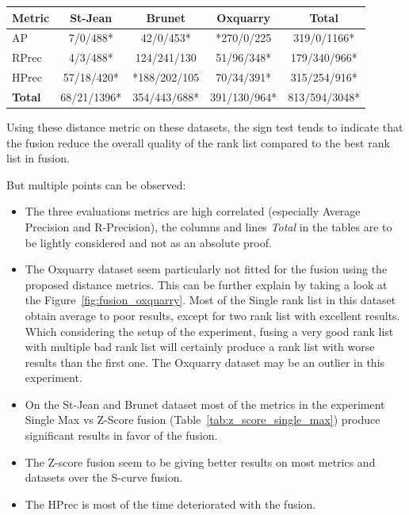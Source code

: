 \begin{table}
  \label{tab:s_curve_z_score}
  \begin{tabular}{l c c c c}
    \toprule
    Metric        & St-Jean     & Brunet       & Oxquarry     & \textbf{Total} \\ \midrule
    AP            & 7/0/488*    & 42/0/453*    & *270/0/225   & 319/0/1166*    \\
    RPrec         & 4/3/488*    & 124/241/130  & 51/96/348*   & 179/340/966*   \\
    HPrec         & 57/18/420*  & *188/202/105 & 70/34/391*   & 315/254/916*   \\
    \textbf{Total}& 68/21/1396* & 354/443/688* & 391/130/964* & 813/594/3048*  \\
    \bottomrule
  \end{tabular}
\end{table}

Using these distance metric on these datasets, the sign test tends to indicate that the fusion reduce the overall quality of the rank list compared to the best rank list in fusion.

But multiple points can be observed:
\begin{itemize}
  \item
  The three evaluations metrics are high correlated (especially Average Precision and R-Precision), the columns and lines \textit{Total} in the tables are to be lightly considered and not as an absolute proof.
  \item
  The Oxquarry dataset seem particularly not fitted for the fusion using the proposed distance metrics.
  This can be further explain by taking a look at the Figure~\ref{fig:fusion_oxquarry}.
  Most of the Single rank list in this dataset obtain average to poor results, except for two rank list with excellent results.
  Which considering the setup of the experiment, fusing a very good rank list with multiple bad rank list will certainly produce a rank list with worse results than the first one.
  The Oxquarry dataset may be an outlier in this experiment.
  \item
  On the St-Jean and Brunet dataset most of the metrics in the experiment Single Max vs Z-Score fusion (Table~\ref{tab:z_score_single_max}) produce significant results in favor of the fusion.
  \item
  The Z-score fusion seem to be giving better results on most metrics and datasets over the S-curve fusion.
  \item
  The HPrec is most of the time deteriorated with the fusion.
\end{itemize}

